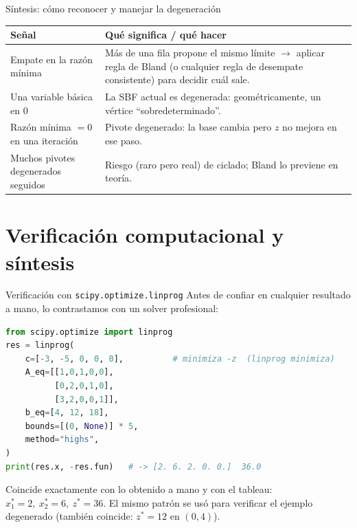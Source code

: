 \documentclass[aspectratio=169]{beamer}
\begin{document}
\begin{frame}{Síntesis: cómo reconocer y manejar la degeneración}
\begin{center}
\renewcommand{\arraystretch}{1.35}
\begin{tabular}{@{}p{4.6cm}p{7.6cm}@{}}
\toprule
\textbf{Señal} & \textbf{Qué significa / qué hacer}\\
\midrule
Empate en la razón mínima & Más de una fila propone el mismo límite $\to$ aplicar regla de Bland (o cualquier regla de desempate consistente) para decidir cuál sale.\\
Una variable básica en $0$ & La SBF actual es degenerada: geométricamente, un vértice ``sobredeterminado''.\\
Razón mínima $=0$ en una iteración & Pivote degenerado: la base cambia pero $z$ no mejora en ese paso.\\
Muchos pivotes degenerados seguidos & Riesgo (raro pero real) de ciclado; Bland lo previene en teoría.\\
\bottomrule
\end{tabular}
\end{center}
\end{frame}

\section{Verificación computacional y síntesis}

\begin{frame}[fragile]{Verificación con \texttt{scipy.optimize.linprog}}
Antes de confiar en cualquier resultado a mano, lo contrastamos con un solver profesional:

\begin{lstlisting}[language=Python]
from scipy.optimize import linprog
res = linprog(
    c=[-3, -5, 0, 0, 0],          # minimiza -z  (linprog minimiza)
    A_eq=[[1,0,1,0,0],
          [0,2,0,1,0],
          [3,2,0,0,1]],
    b_eq=[4, 12, 18],
    bounds=[(0, None)] * 5,
    method="highs",
)
print(res.x, -res.fun)   # -> [2. 6. 2. 0. 0.]  36.0
\end{lstlisting}

Coincide exactamente con lo obtenido a mano y con el tableau: $x_1^\ast=2,\ x_2^\ast=6,\ z^\ast=36$. El mismo patrón se usó para verificar el ejemplo degenerado (también coincide: $z^\ast=12$ en $(0,4)$).
\end{frame}
\end{document}
